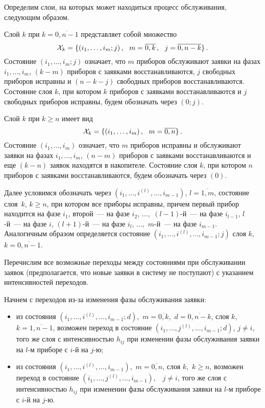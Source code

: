 \begin{multicols}{2}
Определим слои, на которых может находиться процесс обслуживания,
следующим образом.

Слой $k$ при $k=\overline{0,n-1}$ представляет собой множество
\begin{equation*}
{\cal X}_k
=
\{(i_1,\ldots,i_m;j)\,,\ \ m=\overline{0,k}\,,\ \   j=\overline{0,n-k}\}\,.
\end{equation*}
Состояние $(i_1,\ldots,i_m;j)$ означает, что $m$ приборов обслуживают
заявки на фазах $i_1,\ldots, i_m$, $(k-m)$ приборов с заявками
восстанавливаются, $j$ свободных приборов исправны и $(n-k-j)$ свободных
приборов восстанавливаются.
Состояние слоя $k$, при котором $k$ приборов с заявками
восстанавливаются и $j$ свободных приборов исправны, будем обозначать
через $(0;j)$.

Слой $k$ при $k \ge n$ имеет вид
\begin{equation*}
{\cal X}_k
=
\{(i_1,\ldots,i_m)\,,\ \ m=\overline{0,n}\}\,.
\end{equation*}
Состояние $(i_1,\ldots,i_m)$ означает, что $m$ приборов исправны и
обслуживают заявки на фазах $i_1,\ldots,i_m$, $(n-m)$ приборов с
заявками восстанавливаются и еще $(k-n)$ заявок находятся в накопителе.
Состояние слоя $k$, при котором $n$ приборов с заявками
восстанавливаются, будем обозначать через $(0)$.

Далее условимся обозначать через
$(i_1,\ldots,i^{(l)},\ldots,i_{m-1})$, $l=\overline{1,m}$,
состояние слоя~$k$, $k \ge n$, при котором  все приборы исправны,
причем первый прибор находится на фазе $i_1$,
второй~--- на фазе $i_2$,
$\ldots,$
$(l-1)$-й~--- на фазе $i_{l-1}$,
$l$-й~--- на фазе $i$,
$(l+1)$-й~--- на фазе $i_{l}$,
$\ldots,$
$m$-й~--- на фазе $i_{m-1}$.
Аналогичным образом определяется состояние
$(i_1,\ldots,i^{(l)},\ldots,i_{m-1};j)$
слоя $k$, $k=\overline{0,n-1}$.

Перечислим все возможные переходы между состояниями при обслуживании
заявок (предполагается, что новые заявки в систему не поступают)
с указанием интенсивностей переходов.

Начнем с переходов из-за изменения фазы обслуживания заявки:
\begin{itemize}
\item из состояния
$(i_1,\ldots,i^{(l)},\ldots,i_{m-1};d)$,\
$m=\overline{0,k}$,\  $d=\overline{0,n-k}$,
слоя $k$, $k=\overline{1,n-1}$, возможен переход в состояние
$(i_1,\ldots,j^{(l)},\ldots,i_{m-1};d)$, $j\ne i$,
того же слоя с интенсивностью $h_{ij}$ при изменении фазы
обслуживания заявки на $l$-м приборе с $i$-й на $j$-ю;
\item
 из состояния
$(i_1,\ldots,i^{(l)},\ldots,i_{m-1})$,\ $m=\overline{0,n}$,
слоя $k$,\ $k\ge n$, возможен переход в состояние
$(i_1,\ldots,j^{(l)},\ldots,i_{m-1})$,\ \ $j\ne i$,
того же слоя с интенсивностью $h_{ij}$ при изменении фазы
обслуживания заявки на $l$-м приборе с $i$-й на $j$-ю.
\end{itemize}


\end{multicols}

